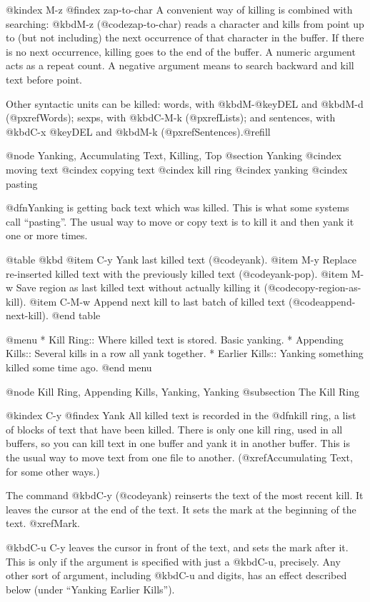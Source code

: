 {{{{{{{{@kindex M-z
@findex zap-to-char
  A convenient way of killing is combined with searching: @kbd{M-z}
(@code{zap-to-char}) reads a character and kills from point up to (but not
including) the next occurrence of that character in the buffer.  If there
is no next occurrence, killing goes to the end of the buffer.  A numeric
argument acts as a repeat count.  A negative argument means to search
backward and kill text before point.

  Other syntactic units can be killed: words, with @kbd{M-@key{DEL}} and
@kbd{M-d} (@pxref{Words}); sexps, with @kbd{C-M-k} (@pxref{Lists}); and
sentences, with @kbd{C-x @key{DEL}} and @kbd{M-k}
(@pxref{Sentences}).@refill

@node Yanking, Accumulating Text, Killing, Top
@section Yanking
@cindex moving text
@cindex copying text
@cindex kill ring
@cindex yanking
@cindex pasting

  @dfn{Yanking} is getting back text which was killed.  This is what some
systems call ``pasting''.  The usual way to move or copy text is to kill it
and then yank it one or more times.

@table @kbd
@item C-y
Yank last killed text (@code{yank}).
@item M-y
Replace re-inserted killed text with the previously killed text
(@code{yank-pop}).
@item M-w
Save region as last killed text without actually killing it
(@code{copy-region-as-kill}).
@item C-M-w
Append next kill to last batch of killed text (@code{append-next-kill}).
@end table

@menu
* Kill Ring::       Where killed text is stored.  Basic yanking.
* Appending Kills:: Several kills in a row all yank together.
* Earlier Kills::   Yanking something killed some time ago.
@end menu

@node Kill Ring, Appending Kills, Yanking, Yanking
@subsection The Kill Ring

@kindex C-y
@findex Yank
  All killed text is recorded in the @dfn{kill ring}, a list of blocks of
text that have been killed.  There is only one kill ring, used in all
buffers, so you can kill text in one buffer and yank it in another buffer.
This is the usual way to move text from one file to another.
(@xref{Accumulating Text}, for some other ways.)

  The command @kbd{C-y} (@code{yank}) reinserts the text of the most recent
kill.  It leaves the cursor at the end of the text.  It sets the mark at
the beginning of the text.  @xref{Mark}.

  @kbd{C-u C-y} leaves the cursor in front of the text, and sets the mark
after it.  This is only if the argument is specified with just a @kbd{C-u},
precisely.  Any other sort of argument, including @kbd{C-u} and digits, has
an effect described below (under ``Yanking Earlier Kills'').

}}}}}}}}

